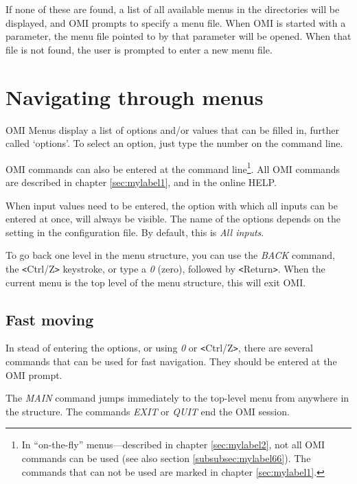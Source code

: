 \documentclass[a4paper]{book}
\newcommand{\vs}{\vspace{3mm}}
\newcommand{\lt}{\texttt{<}}
\newcommand{\gt}{\texttt{>}}
\begin{document}
If none of these are found, a list of all available menus in the directories 
will be displayed, and OMI prompts to specify a menu file. When OMI is 
started with a parameter, the menu file pointed to by that parameter will be 
opened. When that file is not found, the user is prompted to enter a new 
menu file.

\section{Navigating through menus}
\label{subsec:navigating}

OMI Menus display a list of options and/or values that can be filled in, 
further called `options'. To select an option, just type the number on the 
command line.

\vs

OMI commands can also be entered at the command line\footnote{ In 
``on-the-fly'' menus---described in chapter \ref{sec:mylabel2},
not all OMI commands can be used (see also section 
\ref{subsubsec:mylabel66}). The commands that can not be used are 
marked in chapter \ref{sec:mylabel1}.}. All OMI commands are 
described in chapter \ref{sec:mylabel1}, and in the online HELP.

\vs

When input values need to be entered, the option with which all inputs can 
be entered at once, will always be visible. The name of the options depends 
on the setting in the configuration file. By default, this is \textsl{All inputs}.

\vs

To go back one level in the menu structure, you can use the \textsl{BACK} command, the \lt Ctrl/Z\gt{} keystroke, or type a \textsl{0} (zero), 
followed by \lt Return\gt . When the current menu is the top level of the menu 
structure, this will exit OMI.

\subsection{Fast moving}
\label{subsubsec:mylabel9}

In stead of entering the options, or using \textsl{0} or \lt Ctrl/Z\gt , there are 
several commands that can be used for fast navigation. They should be 
entered at the OMI prompt.

\vs

The \textsl{MAIN} command jumps immediately to the top-level 
menu from anywhere in the structure. The commands \textsl{EXIT} or \textsl{QUIT} end the OMI session.
\end{document}
